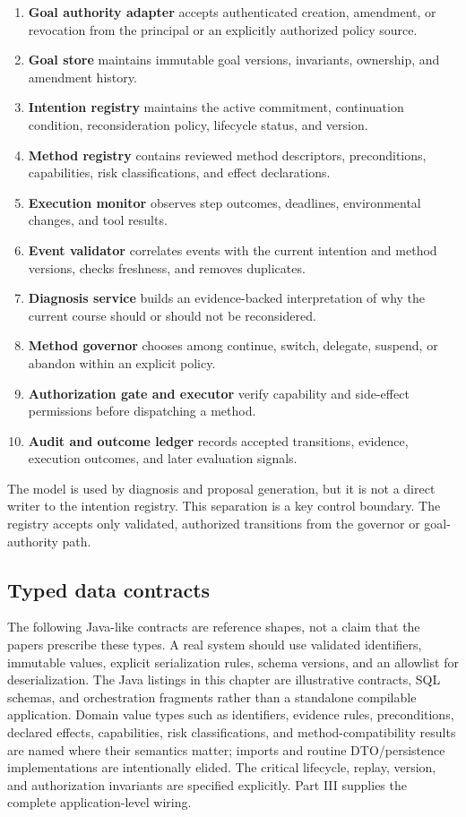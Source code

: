 \begin{enumerate}
  \item \textbf{Goal authority adapter} accepts authenticated creation, amendment, or revocation from the principal or an explicitly authorized policy source.
  \item \textbf{Goal store} maintains immutable goal versions, invariants, ownership, and amendment history.
  \item \textbf{Intention registry} maintains the active commitment, continuation condition, reconsideration policy, lifecycle status, and version.
  \item \textbf{Method registry} contains reviewed method descriptors, preconditions, capabilities, risk classifications, and effect declarations.
  \item \textbf{Execution monitor} observes step outcomes, deadlines, environmental changes, and tool results.
  \item \textbf{Event validator} correlates events with the current intention and method versions, checks freshness, and removes duplicates.
  \item \textbf{Diagnosis service} builds an evidence-backed interpretation of why the current course should or should not be reconsidered.
  \item \textbf{Method governor} chooses among continue, switch, delegate, suspend, or abandon within an explicit policy.
  \item \textbf{Authorization gate and executor} verify capability and side-effect permissions before dispatching a method.
  \item \textbf{Audit and outcome ledger} records accepted transitions, evidence, execution outcomes, and later evaluation signals.
\end{enumerate}

The model is used by diagnosis and proposal generation, but it is not a direct writer to the intention registry. This separation is a key control boundary. The registry accepts only validated, authorized transitions from the governor or goal-authority path.

\subsection{Typed data contracts}

The following Java-like contracts are reference shapes, not a claim that the papers prescribe these types. A real system should use validated identifiers, immutable values, explicit serialization rules, schema versions, and an allowlist for deserialization. The Java listings in this chapter are illustrative contracts, SQL schemas, and orchestration fragments rather than a standalone compilable application. Domain value types such as identifiers, evidence rules, preconditions, declared effects, capabilities, risk classifications, and method-compatibility results are named where their semantics matter; imports and routine DTO/persistence implementations are intentionally elided. The critical lifecycle, replay, version, and authorization invariants are specified explicitly. Part III supplies the complete application-level wiring.

